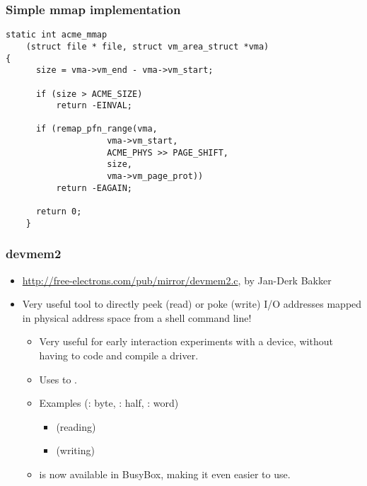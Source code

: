 \begin{frame}[fragile]
  \frametitle{Simple mmap implementation}
  \begin{verbatim}
static int acme_mmap
    (struct file * file, struct vm_area_struct *vma)
{
      size = vma->vm_end - vma->vm_start;

      if (size > ACME_SIZE)
          return -EINVAL;

      if (remap_pfn_range(vma,
                    vma->vm_start,
                    ACME_PHYS >> PAGE_SHIFT,
                    size,
                    vma->vm_page_prot))
          return -EAGAIN;

      return 0;
    }
  \end{verbatim}
\end{frame}

\begin{frame}
  \frametitle{devmem2}
  \begin{itemize}
  \item \url{http://free-electrons.com/pub/mirror/devmem2.c}, by Jan-Derk
    Bakker
  \item Very useful tool to directly peek (read) or poke
    (write) I/O addresses mapped in physical address space from a
    shell command line!
    \begin{itemize}
    \item Very useful for early interaction experiments with a device,
      without having to code and compile a driver.
    \item Uses  to .
    \item Examples (: byte, : half, : word)
      \begin{itemize}
      \item {} (reading)
      \item {} (writing)
      \end{itemize}
    \item {} is now available in BusyBox, making it even easier to
      use.
    \end{itemize}
  \end{itemize}
\end{frame}


